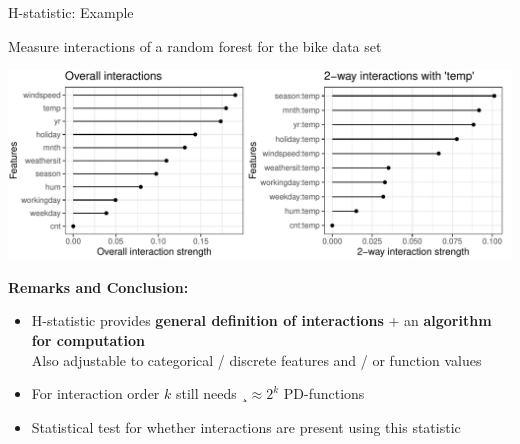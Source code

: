 \documentclass[10pt,compress,t,notes=noshow, xcolor=table]{beamer}
\begin{document}
\begin{frame}{H-statistic: Example}

Measure interactions of a random forest for the bike data set

\begin{center}
	\includegraphics[width=\textwidth]{figure/h-statistic}
\end{center}

\pause
\textbf{Remarks and Conclusion:}
\begin{itemize}
    \item H-statistic provides \textbf{general definition of interactions} + an \textbf{algorithm for computation} \\
    Also adjustable to categorical / discrete features and / or function values
    \item For interaction order $k$ still needs $¸\approx 2^k$ PD-functions
    \item Statistical test for whether interactions are present using this statistic
\end{itemize}

\end{frame}

\endlecture
\end{document}

